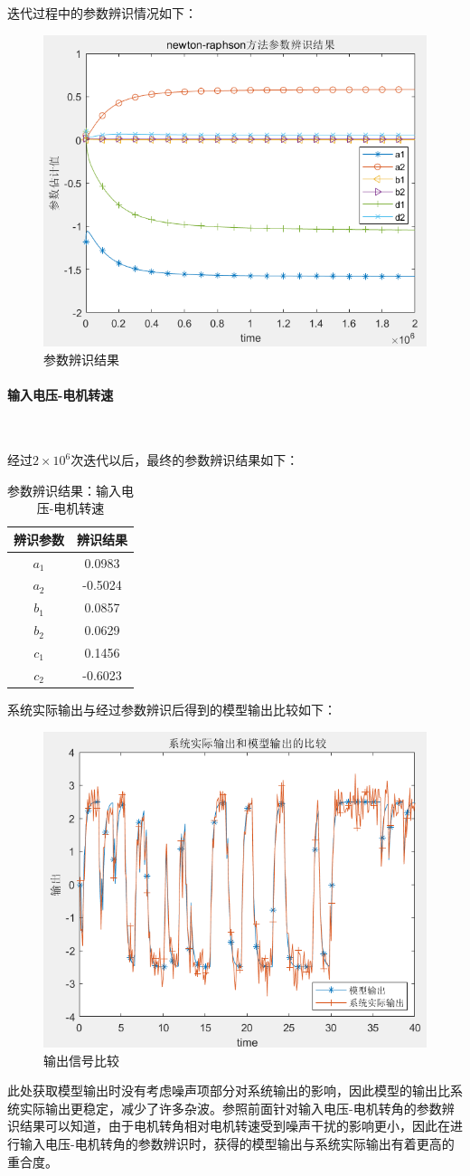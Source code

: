 \documentclass[UTF8, twocolumn]{article}
\begin{document}
迭代过程中的参数辨识情况如下：
\begin{figure}[H]
    \centering %
    \includegraphics[width=.4\textwidth]{figure/newton-参数辨识结果.png} 
    \caption{参数辨识结果} %
\end{figure}

\paragraph{输入电压-电机转速}~{}

经过$2 \times 10^6$次迭代以后，最终的参数辨识结果如下：
\begin{table}[H] %
\centering %
\begin{tabular}{cc} %
	\toprule %
	辨识参数 & 辨识结果 \\
	\midrule %
	$a_1$ & 0.0983 \\
	$a_2$ & -0.5024 \\
	$b_1$ & 0.0857 \\
	$b_2$ & 0.0629 \\
	$c_1$ & 0.1456 \\
	$c_2$ & -0.6023 \\
	\bottomrule %
\end{tabular}
\caption{参数辨识结果：输入电压-电机转速} %
\end{table}

系统实际输出与经过参数辨识后得到的模型输出比较如下：
\begin{figure}[H]
    \centering %
    \includegraphics[width=.4\textwidth]{figure/newton-转速-输出比较.png} 
    \caption{输出信号比较} %
\end{figure}
此处获取模型输出时没有考虑噪声项部分对系统输出的影响，因此模型的输出比系统实际输出更稳定，减少了许多杂波。参照前面针对输入电压-电机转角的参数辨识结果可以知道，由于电机转角相对电机转速受到噪声干扰的影响更小，因此在进行输入电压-电机转角的参数辨识时，获得的模型输出与系统实际输出有着更高的重合度。
\end{document}
